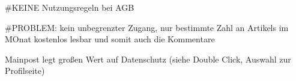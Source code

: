 #KEINE Nutzungsregeln bei AGB

#PROBLEM: kein unbegrenzter Zugang, nur bestimmte Zahl an Artikels im MOnat kostenlos lesbar und somit auch die Kommentare































Mainpost legt großen Wert auf Datenschutz (siehe Double Click, Auswahl zur Profilseite)
